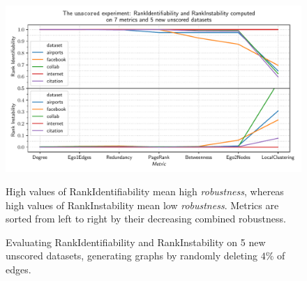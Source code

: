 \begin{figure}
    \includegraphics[width=\linewidth]{plot_unscored.pdf}
    \vspace*{-0.6cm}
    \caption{Evaluating RankIdentifiability and RankInstability on 5 new unscored datasets, generating graphs by randomly deleting $4\%$ of edges.}
    \label{fig:plot_unscored}
    \footnotesize
    \begin{flushleft}
        High values of RankIdentifiability mean high \textsl{robustness}, whereas high values of RankInstability mean low \textsl{robustness}.
        Metrics are sorted from left to right by their decreasing combined robustness.
    \end{flushleft}
\end{figure}
